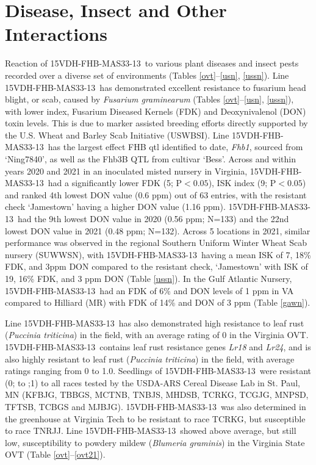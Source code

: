 \documentclass[12pt, letterpaper]{article}
\newcommand{\lin}{15VDH-FHB-MAS33-13~}
\begin{document}
\section{Disease, Insect and Other Interactions}

Reaction of \lin to various plant diseases and insect pests recorded over a diverse set of environments (Tables \ref{ovt}--\ref{usn}, \ref{ussn}). Line \lin has demonstrated excellent resistance to fusarium head blight, or scab, caused by \textit{Fusarium graminearum} (Tables \ref{ovt}--\ref{usn}, \ref{ussn}), with lower index, Fusarium Diseased Kernels (FDK) and Deoxynivalenol (DON) toxin levels. This is due to marker assisted breeding efforts directly supported by the U.S. Wheat and Barley Scab Initiative (USWBSI). Line \lin has the largest effect FHB qtl identified to date, \textit{Fhb1}, sourced from `Ning7840', as well as the Fhb3B QTL from cultivar `Bess'.  Across and within years 2020 and 2021 in an inoculated misted nursery in Virginia, \lin had a significantly lower FDK (5; P$<0.05$), ISK index (9; P$<0.05$) and ranked 4th lowest DON value (0.6 ppm) out of 63 entries, with the resistant check `Jamestown' having a higher DON value (1.16 ppm). \lin had the 9th lowest DON value in 2020 (0.56 ppm; N=133) and the 22nd lowest DON value in 2021 (0.48 ppm; N=132). Across 5 locations in 2021, similar performance was observed in the regional  Southern Uniform Winter Wheat Scab nursery (SUWWSN), with \lin having a mean ISK of 7, 18\% FDK, and 3ppm DON compared to the resistant check, `Jamestown' with ISK of 19, 16\% FDK, and 3 ppm DON (Table \ref{ussn}). In the Gulf Atlantic Nursery, \lin had an FDK of 6\% and DON levels of 1 ppm in VA compared to Hilliard (MR) with FDK of 14\% and DON of 3 ppm (Table \ref{gawn}). 

Line \lin has also demonstrated high resistance to leaf rust (\textit{Puccinia triticina}) in the field, with an average rating of 0 in the Virginia OVT. \lin contains leaf rust resistance genes \textit{Lr18} and \textit{Lr24}, and is also highly resistant to leaf rust (\textit{Puccinia triticina}) in the field, with average ratings ranging from 0 to 1.0. Seedlings of \lin were resistant (0; to ;1) to all races tested by the USDA-ARS Cereal Disease Lab in St. Paul, MN (KFBJG, TBBGS, MCTNB, TNBJS, MHDSB, TCRKG, TCGJG, MNPSD, TFTSB, TCBGS and MJBJG). \lin was also determined in the greenhouse at Virginia Tech to be resistant to race TCRKG, but susceptible to race TNRJJ. Line \lin showed above average, but still low, susceptibility to powdery mildew (\textit{Blumeria graminis}) in the Virginia State OVT (Table \ref{ovt}--\ref{ovt21}).
\end{document}
